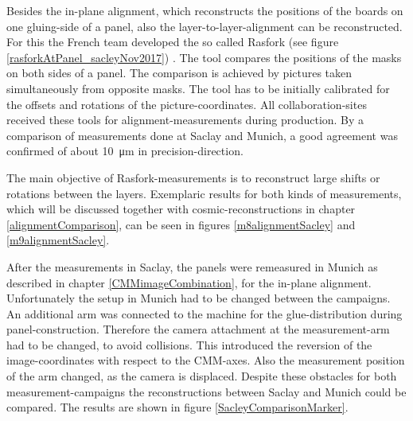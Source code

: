 \documentclass[
twoside,            %
BCOR1.4cm,          %
10pt,               %
headings=normal,    %
headsepline,        %
clearplainpage,		%
final,              %
div=14,
open=right,
bibliography=toc
]{scrreprt}
\begin{document}
Besides the in-plane alignment, which reconstructs the positions of the boards on one gluing-side of a panel, also the layer-to-layer-alignment can be reconstructed.
For this the French team developed the so called Rasfork (see figure \ref{rasforkAtPanel_sacleyNov2017}) \cite{giraudRasfork}.
The tool compares the positions of the masks on both sides of a panel.
The comparison is achieved by pictures taken simultaneously from opposite masks.
The tool has to be initially calibrated for the offsets and rotations of the picture-coordinates.
All collaboration-sites received these tools for alignment-measurements during production.
By a comparison of measurements done at Saclay and Munich, a good agreement was confirmed of about \SI{10}{\micro\m} in precision-direction.

The main objective of Rasfork-measurements is to reconstruct large shifts or rotations between the layers.
Exemplaric results for both kinds of measurements, which will be discussed together with cosmic-reconstructions in chapter \ref{alignmentComparison}, can be seen in figures \ref{m8alignmentSacley} and \ref{m9alignmentSacley}.

After the measurements in Saclay, the panels were remeasured in Munich as described in chapter \ref{CMMimageCombination}, for the in-plane alignment.
Unfortunately the setup in Munich had to be changed between the campaigns.
An additional arm was connected to the machine for the glue-distribution during panel-construction.
Therefore the camera attachment at the measurement-arm had to be changed, to avoid collisions.
This introduced the reversion of the image-coordinates with respect to the CMM-axes.
Also the measurement position of the arm changed, as the camera is displaced.
Despite these obstacles for both measurement-campaigns the reconstructions between Saclay and Munich could be compared.
The results are shown in figure \ref{SacleyComparisonMarker}.
\end{document}
